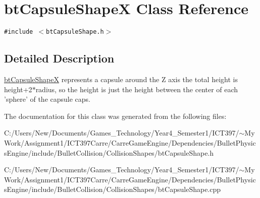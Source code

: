 \hypertarget{classbt_capsule_shape_x}{
\section{btCapsuleShapeX Class Reference}
\label{classbt_capsule_shape_x}
}
{\tt \#include $<$btCapsuleShape.h$>$}



\subsection{Detailed Description}
\hyperlink{classbt_capsule_shape_x}{btCapsuleShapeX} represents a capsule around the Z axis the total height is height+2$\ast$radius, so the height is just the height between the center of each 'sphere' of the capsule caps. 

The documentation for this class was generated from the following files:\begin{CompactItemize}
\item 
C:/Users/New/Documents/Games\_\-Technology/Year4\_\-Semester1/ICT397/$\sim$My Work/Assignment1/ICT397Carre/CarreGameEngine/Dependencies/BulletPhysicsEngine/include/BulletCollision/CollisionShapes/btCapsuleShape.h\item 
C:/Users/New/Documents/Games\_\-Technology/Year4\_\-Semester1/ICT397/$\sim$My Work/Assignment1/ICT397Carre/CarreGameEngine/Dependencies/BulletPhysicsEngine/include/BulletCollision/CollisionShapes/btCapsuleShape.cpp\end{CompactItemize}
